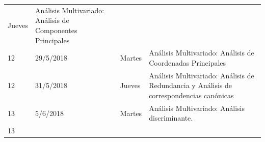 \documentclass[]{book}
\theoremstyle{definition}
\theoremstyle{definition}
\theoremstyle{definition}
\theoremstyle{remark}
\begin{document}
\begin{longtable}[]{@{}llll@{}}
\begin{minipage}[t]{0.05\columnwidth}
Jueves\strut
\end{minipage} & \begin{minipage}[t]{0.71\columnwidth}\raggedright
Análisis Multivariado: Análisis de Componentes Principales\strut
\end{minipage}\tabularnewline
\begin{minipage}[t]{0.05\columnwidth}\raggedright
12\strut
\end{minipage} & \begin{minipage}[t]{0.07\columnwidth}\raggedright
29/5/2018\strut
\end{minipage} & \begin{minipage}[t]{0.05\columnwidth}\raggedright
Martes\strut
\end{minipage} & \begin{minipage}[t]{0.71\columnwidth}\raggedright
Análisis Multivariado: Análisis de Coordenadas Principales\strut
\end{minipage}\tabularnewline
\begin{minipage}[t]{0.05\columnwidth}\raggedright
12\strut
\end{minipage} & \begin{minipage}[t]{0.07\columnwidth}\raggedright
31/5/2018\strut
\end{minipage} & \begin{minipage}[t]{0.05\columnwidth}\raggedright
Jueves\strut
\end{minipage} & \begin{minipage}[t]{0.71\columnwidth}\raggedright
Análisis Multivariado: Análisis de Redundancia y Análisis de
correspondencias canónicas\strut
\end{minipage}\tabularnewline
\begin{minipage}[t]{0.05\columnwidth}\raggedright
13\strut
\end{minipage} & \begin{minipage}[t]{0.07\columnwidth}\raggedright
5/6/2018\strut
\end{minipage} & \begin{minipage}[t]{0.05\columnwidth}\raggedright
Martes\strut
\end{minipage} & \begin{minipage}[t]{0.71\columnwidth}\raggedright
Análisis Multivariado: Análisis discriminante.\strut
\end{minipage}\tabularnewline
\begin{minipage}[t]{0.05\columnwidth}\raggedright
13\strut
\end{minipage} & \begin{minipage}[t]{0.07\columnwidth}\raggedright

\end{minipage}
\end{longtable}
\end{document}
